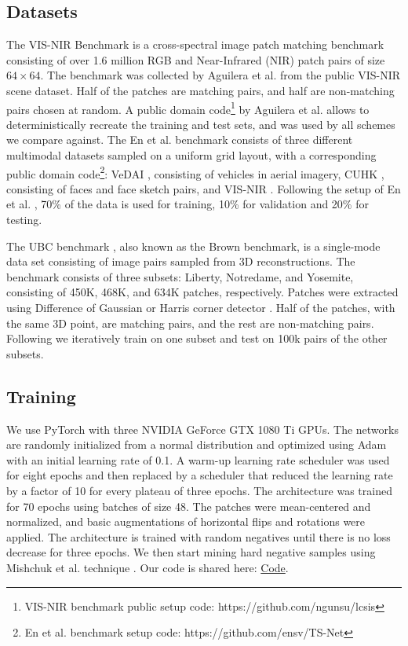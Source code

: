 \documentclass[10pt,journal]{IEEEtran}\usepackage{amsfonts}
\begin{document}
\subsection{Datasets}

The VIS-NIR Benchmark \cite{SiameseCrossSpectral} is a cross-spectral image
patch matching benchmark consisting of over 1.6 million RGB and
Near-Infrared (NIR) patch pairs of size $64\times 64$. The benchmark was
collected by Aguilera et al. \cite{SiameseCrossSpectral, Q-net} from the
public VIS-NIR scene dataset. Half of the patches are matching pairs, and
half are non-matching pairs chosen at random. A public domain code\footnote{VIS-NIR benchmark public setup code: https://github.com/ngunsu/lcsis} by
Aguilera et al. allows to deterministically recreate the training and test
sets, and was used by all schemes we compare against. The En et al.
benchmark \cite{TS-net} consists of three different multimodal datasets
sampled on a uniform grid layout, with a corresponding public domain code\footnote{En et al. benchmark setup code: https://github.com/ensv/TS-Net}: VeDAI \cite {Vedai}, consisting of vehicles in aerial imagery, CUHK \cite{CUHK},
consisting of faces and face sketch pairs, and VIS-NIR \cite {SiameseCrossSpectral}. Following the setup of En et al. \cite{TS-net}, 70\%
of the data is used for training, 10\% for validation and 20\% for testing.

The UBC benchmark \cite{UBC_benchmark}, also known as the Brown benchmark,
is a single-mode data set consisting of image pairs sampled from 3D
reconstructions. The benchmark consists of three subsets: Liberty,
Notredame, and Yosemite, consisting of 450K, 468K, and 634K patches,
respectively. Patches were extracted using Difference of Gaussian \cite{SIFT}
or Harris corner detector \cite{harris}. Half of the patches, with the same
3D point, are matching pairs, and the rest are non-matching pairs. Following
\cite{UBC_benchmark, L2Net, Zagoruyko, HardNet} we iteratively train on one
subset and test on 100k pairs of the other subsets.

\subsection{Training}

We use PyTorch \cite{PyTorch} with three NVIDIA GeForce GTX 1080 Ti GPUs.
The networks are randomly initialized from a normal distribution and
optimized using Adam \cite{Adam} with an initial learning rate of 0.1. A
warm-up learning rate scheduler \cite{ImageNetOneHour} was used for eight
epochs and then replaced by a scheduler that reduced the learning rate by a
factor of 10 for every plateau of three epochs. The architecture was trained
for 70 epochs using batches of size 48. The patches were mean-centered and
normalized, and basic augmentations of horizontal flips and rotations were
applied. The architecture is trained with random negatives until there is no
loss decrease for three epochs. We then start mining hard negative samples
using Mishchuk et al. technique \cite{HardNet}. Our code is shared here:
\href{https://github.com/CodeJjang/multiscale-attention-patch-matching}{Code}.
\end{document}

